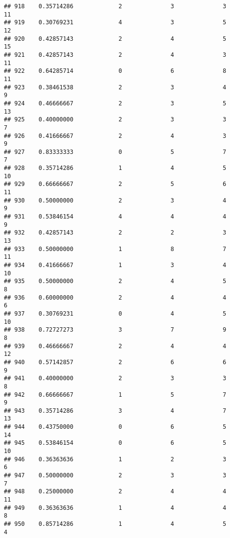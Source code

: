 \documentclass[
]{article}
\begin{document}
\begin{verbatim}
## 918    0.35714286             2              3              3             11
## 919    0.30769231             4              3              5             12
## 920    0.42857143             2              4              5             15
## 921    0.42857143             2              4              3             11
## 922    0.64285714             0              6              8             11
## 923    0.38461538             2              3              4              9
## 924    0.46666667             2              3              5             13
## 925    0.40000000             2              3              3              7
## 926    0.41666667             2              4              3              9
## 927    0.83333333             0              5              7              7
## 928    0.35714286             1              4              5             10
## 929    0.66666667             2              5              6             11
## 930    0.50000000             2              3              4              9
## 931    0.53846154             4              4              4              9
## 932    0.42857143             2              2              3             13
## 933    0.50000000             1              8              7             11
## 934    0.41666667             1              3              4             10
## 935    0.50000000             2              4              5              8
## 936    0.60000000             2              4              4              6
## 937    0.30769231             0              4              5             10
## 938    0.72727273             3              7              9              8
## 939    0.46666667             2              4              4             12
## 940    0.57142857             2              6              6              9
## 941    0.40000000             2              3              3              8
## 942    0.66666667             1              5              7              9
## 943    0.35714286             3              4              7             13
## 944    0.43750000             0              6              5             14
## 945    0.53846154             0              6              5             10
## 946    0.36363636             1              2              3              6
## 947    0.50000000             2              3              3              7
## 948    0.25000000             2              4              4             11
## 949    0.36363636             1              4              4              8
## 950    0.85714286             1              4              5              4

\end{verbatim}
\end{document}
